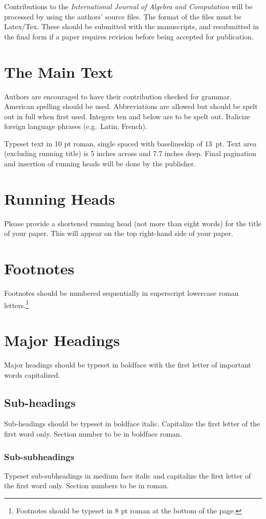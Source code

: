 \documentclass{ws-ijac}
\begin{document}
Contributions to the {\it International Journal of Algebra and Computation}
will be processed by using the authors' source files. The format of
the files must be Latex/Tex.  These should be submitted with the
manuscripts, and resubmitted in the final form if a paper requires
revision before being accepted for publication.

\section{The Main Text}
Authors are encouraged to have their contribution checked for grammar.
American spelling should be used. Abbreviations are allowed but should
be spelt out in full when first used. Integers ten and below are to be
spelt out. Italicize foreign language phrases (e.g.~Latin, French).

Typeset text in 10 pt roman, single spaced with baselineskip of 13~pt.
Text area (excluding running title) is 5 inches across and 7.7 inches deep.
Final pagination and insertion of running heads will be done by
the publisher.

\section{Running Heads}
Please provide a shortened running head (not more than eight words) for
the title of your paper. This will appear on the top right-hand side
of your paper.

\section{Footnotes}
Footnotes should be numbered sequentially in superscript
lowercase roman letters.\footnote{Footnotes should be
typeset in 8 pt roman at the bottom of the page.}

\section{Major Headings}
Major headings should be typeset in boldface with the first letter of
important words capitalized.

\subsection{Sub-headings}
Sub-headings should be typeset in boldface italic. Capitalize the
first letter of the first word only. Section number to be in boldface
roman.

\subsubsection{Sub-subheadings}
Typeset sub-subheadings in medium face italic and capitalize the first
letter of the first word only. Section numbers to be in roman.
\end{document}
